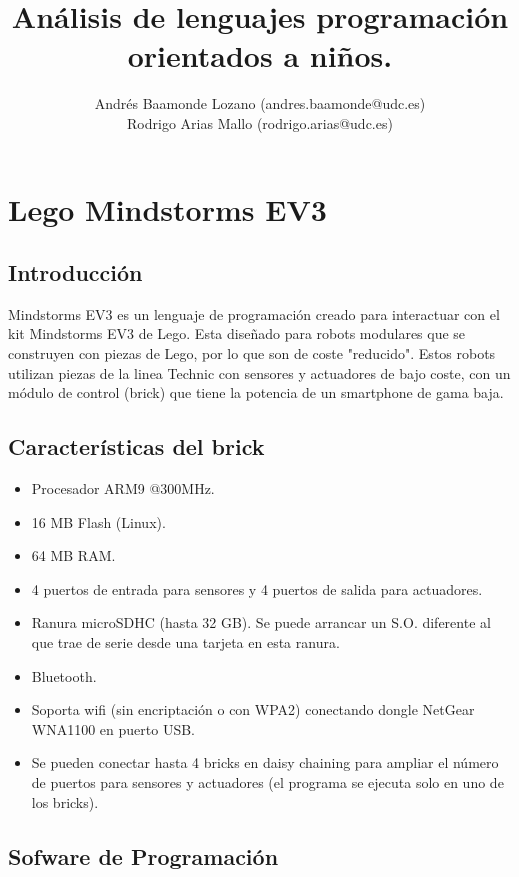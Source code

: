 \documentclass[12pt,a4paper]{article}
\title{Análisis de lenguajes programación orientados a niños.}
\author{Andrés Baamonde Lozano (andres.baamonde@udc.es)\\
	Rodrigo Arias Mallo (rodrigo.arias@udc.es)}
\begin{document}
\maketitle


\section{Lego Mindstorms EV3}

\subsection{Introducción}
Mindstorms EV3 es un lenguaje de programación creado para interactuar con el kit 
Mindstorms EV3 de Lego. Esta diseñado para robots modulares que se construyen 
con piezas de Lego, por lo que son de coste "reducido". Estos robots utilizan 
piezas de la linea Technic con sensores y actuadores de bajo coste, con un 
módulo de control (brick) que tiene la potencia de un smartphone de gama baja.

\subsection{Características del brick}

\begin{itemize}
\item Procesador ARM9 @300MHz.
\item 16 MB Flash (Linux).
\item 64 MB RAM.
\item 4 puertos de entrada para sensores y 4 puertos de salida para actuadores.
\item Ranura microSDHC (hasta 32 GB). Se puede arrancar un S.O. diferente al que
trae de serie desde una tarjeta en esta ranura.
\item Bluetooth.
\item Soporta wifi (sin encriptación o con WPA2) conectando dongle NetGear
WNA1100 en puerto USB.
\item Se pueden conectar hasta 4 bricks en daisy chaining para ampliar el número
de puertos para sensores y actuadores (el programa se ejecuta solo en uno de los
bricks).
\end{itemize}
\subsection{Sofware de Programación}
\end{document}
